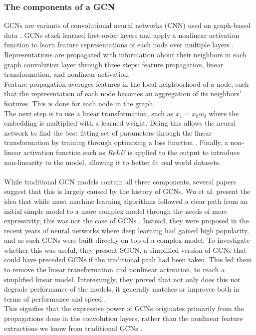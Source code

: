 \subsubsection*{The components of a GCN}
GCNs are variants of convolutional neural networks (CNN) used on graph-based data \cite{KOrderConnectivity}.
GCNs stack learned first-order layers and apply a nonlinear activation function to learn feature representations of each node over multiple layers \cite{KOrderConnectivity}.
Representations are propagated with information about their neighbors in each graph convolution layer through three steps: feature propagation, linear transformation, and nonlinear activation.\\
Feature propagation averages features in the local neighborhood of a node, such that the representation of each node becomes an aggregation of its neighbors' features.
This is done for each node in the graph.\\
The next step is to use a linear transformation, such as $x_1 = x_0w_0$ where the embedding is multiplied with a learned weight.
Doing this allows the neural network to find the best fitting set of parameters through the linear transformation by training through optimizing a loss function \cite{RecentConvNets}.
Finally, a non-linear activation function such as \textit{ReLU} is applied to the output to introduce non-linearity to the model, allowing it to better fit real world datasets.
\\\\
While traditional GCN models contain all three components, several papers \cite{SimplifyingGCN,LightGCN,HeteGCN} suggest that this is largely caused by the history of GCNs.
Wu et al. present the idea that while most machine learning algorithms followed a clear path from an initial simple model to a more complex model through the needs of more expressivity, this was not the case of GCNs \cite{SimplifyingGCN}.
Instead, they were proposed in the recent years of neural networks where deep learning had gained high popularity, and as such GCNs were built directly on top of a complex model.
To investigate whether this was useful, they present SGCN, a simplified version of GCNs that could have preceded GCNs if the traditional path had been taken.
This led them to remove the linear transformation and nonlinear activation, to reach a simplified linear model.
Interestingly, they proved that not only does this not degrade performance of the models, it generally matches or improves both in terms of performance and speed \cite{SimplifyingGCN}.\\
This signifies that the expressive power of GCNs originates primarily from the propagations done in the convolution layers, rather than the nonlinear feature extractions we know from traditional GCNs \cite{SimplifyingGCN}.

